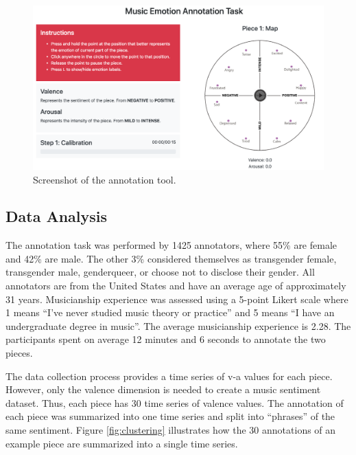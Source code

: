 \begin{figure}[!h]
 \centering
 \includegraphics[width=\columnwidth]{imgs/ismir19/annotation_tool.png}
 \caption{Screenshot of the annotation tool.}
 \label{fig:annotation_main}
\end{figure}

\subsection{Data Analysis}
\label{sec:data_analysys}

The annotation task was performed by 1425 annotators, where 55\% are female and 42\% are male. The other 3\% considered themselves as transgender female, transgender male, genderqueer, or choose not to disclose their gender. All annotators are from the United States and have an average age of approximately 31 years. Musicianship experience was assessed using a 5-point Likert scale where 1 means ``I've never studied music theory or practice'' and 5 means ``I have an undergraduate degree in music''. The average musicianship experience is 2.28. The participants spent on average 12 minutes and 6 seconds to annotate the two pieces.

The data collection process provides a time series of v-a values for each piece. However, only the valence dimension is needed to create a music sentiment dataset. Thus, each piece has 30 time series of valence values. The annotation of each piece was summarized into one time series and split into ``phrases'' of the same sentiment. Figure \ref{fig:clustering} illustrates how the 30 annotations of an example piece are summarized into a single time series.

